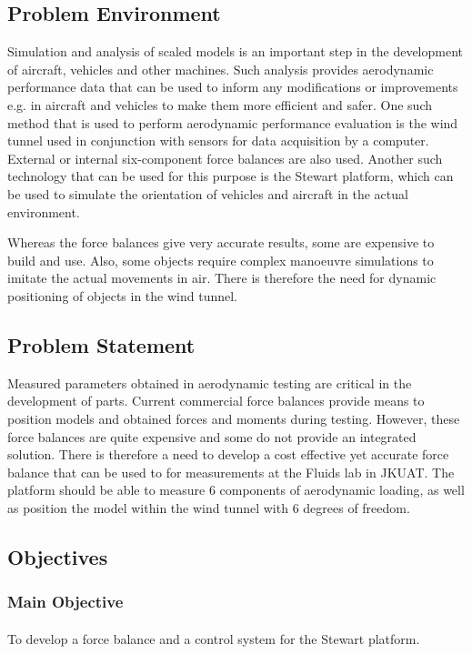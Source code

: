 \subsection{Problem Environment}
Simulation and analysis of scaled models is an important step in the development of aircraft, vehicles and other machines. Such analysis provides aerodynamic performance data that can be used to inform any modifications or improvements e.g. in aircraft and vehicles to make them more efficient and safer. One such method that is used to perform aerodynamic performance evaluation is the wind tunnel used in conjunction with sensors for data acquisition by a computer. External or internal six-component force balances are also used. Another such technology that can be used for this purpose is the Stewart platform, which can be used to simulate the
orientation of vehicles and aircraft in the actual environment.

Whereas the force balances give very accurate results, some are expensive to build and use. Also, some objects require complex manoeuvre simulations to imitate the actual movements in air. There is therefore the need for dynamic positioning of objects in the wind tunnel.
\subsection{Problem Statement}
Measured parameters obtained in aerodynamic testing are critical in the development of parts. Current commercial force balances provide means to position models and obtained forces and moments during testing.
However, these force balances are quite expensive and some do not provide an integrated solution. There is therefore a need to develop a cost effective yet accurate force balance that can be used to for measurements at the Fluids lab in JKUAT. The platform should be able to measure 6 components of aerodynamic loading, as well as position the model within the wind tunnel with 6 degrees of freedom.
\subsection{Objectives}
\subsubsection{Main Objective}
\paragraph{} To develop a force balance and a control system for the Stewart platform.
